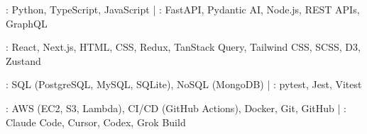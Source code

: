 : Python, TypeScript, JavaScript | : FastAPI, Pydantic AI, Node.js, REST APIs, GraphQL\par
{}: React, Next.js, HTML, CSS, Redux, TanStack Query, Tailwind CSS, SCSS, D3, Zustand\par
{}: SQL (PostgreSQL, MySQL, SQLite), NoSQL (MongoDB) | : pytest, Jest, Vitest\par
{}: AWS (EC2, S3, Lambda), CI/CD (GitHub Actions), Docker, Git, GitHub | : Claude Code, Cursor, Codex, Grok Build\par
